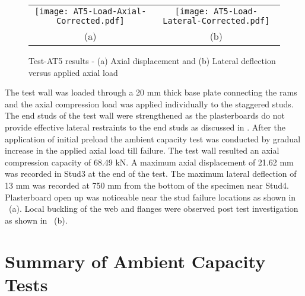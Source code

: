 \begin{figure}
	\centering
		\begin{tabular}{cc}
			\texttt{[image: AT5-Load-Axial-Corrected.pdf]} & \texttt{[image: AT5-Load-Lateral-Corrected.pdf]} \\ 
			(a) & (b)  \\ 
		\end{tabular} 
		\caption{Test-AT5 results - (a) Axial displacement and (b) Lateral deflection versus applied axial load}
		\label{fig:AT4-results}
\end{figure}

The test wall was loaded through a 20 mm thick base plate connecting the rams and the axial compression load was applied individually to the staggered studs. The end studs of the test wall were strengthened as the plasterboards do not provide effective lateral restraints to the end studs as discussed in . After the application of initial preload the ambient capacity test was conducted by gradual increase in the applied axial load till failure. The test wall resulted an axial compression capacity of 68.49 kN. A maximum axial displacement of 21.62 mm was recorded in Stud3 at the end of the test. The maximum lateral deflection of 13 mm was recorded at 750 mm from the bottom of the specimen near Stud4. Plasterboard open up was noticeable near the stud failure locations as shown in ~(a). Local buckling of the web and flanges were observed post test investigation as shown in ~(b).

\section{Summary of Ambient Capacity Tests}


